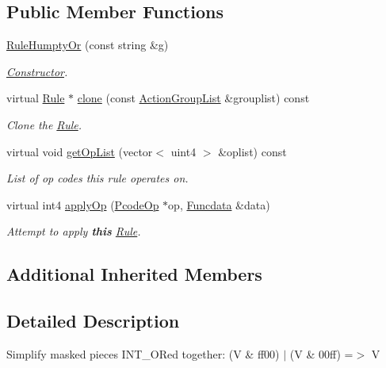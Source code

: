 \subsection*{Public Member Functions}
\begin{DoxyCompactItemize}
\item 
\mbox{\hyperlink{class_rule_humpty_or_ab2a8a1b973bb72d083e16cefa3a47621}{Rule\+Humpty\+Or}} (const string \&g)
\begin{DoxyCompactList}\small\item\em \mbox{\hyperlink{class_constructor}{Constructor}}. \end{DoxyCompactList}\item 
virtual \mbox{\hyperlink{class_rule}{Rule}} $\ast$ \mbox{\hyperlink{class_rule_humpty_or_a7564110956850ec05005818ada05b515}{clone}} (const \mbox{\hyperlink{class_action_group_list}{Action\+Group\+List}} \&grouplist) const
\begin{DoxyCompactList}\small\item\em Clone the \mbox{\hyperlink{class_rule}{Rule}}. \end{DoxyCompactList}\item 
virtual void \mbox{\hyperlink{class_rule_humpty_or_ac0fb90faa8e1028684a89077c3a86c56}{get\+Op\+List}} (vector$<$ uint4 $>$ \&oplist) const
\begin{DoxyCompactList}\small\item\em List of op codes this rule operates on. \end{DoxyCompactList}\item 
virtual int4 \mbox{\hyperlink{class_rule_humpty_or_a247cf69f4d753d28a0bcaa14d8cf0abe}{apply\+Op}} (\mbox{\hyperlink{class_pcode_op}{Pcode\+Op}} $\ast$op, \mbox{\hyperlink{class_funcdata}{Funcdata}} \&data)
\begin{DoxyCompactList}\small\item\em Attempt to apply {\bfseries{this}} \mbox{\hyperlink{class_rule}{Rule}}. \end{DoxyCompactList}\end{DoxyCompactItemize}
\subsection*{Additional Inherited Members}


\subsection{Detailed Description}
Simplify masked pieces I\+N\+T\+\_\+\+O\+Red together\+: {\ttfamily (V \& ff00) $\vert$ (V \& 00ff) =$>$ V} 

